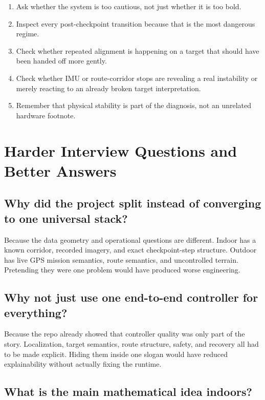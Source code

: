 \documentclass[11pt]{article}
\begin{document}
\begin{enumerate}[nosep]
  \item Ask whether the system is too cautious, not just whether it is too bold.
  \item Inspect every post-checkpoint transition because that is the most dangerous
  regime.
  \item Check whether repeated alignment is happening on a target that should have
  been handed off more gently.
  \item Check whether IMU or route-corridor stops are revealing a real instability
  or merely reacting to an already broken target interpretation.
  \item Remember that physical stability is part of the diagnosis, not an unrelated
  hardware footnote.
\end{enumerate}

\section{Harder Interview Questions and Better Answers}

\subsection*{Why did the project split instead of converging to one universal stack?}

Because the data geometry and operational questions are different. Indoor has a
known corridor, recorded imagery, and exact checkpoint-step structure. Outdoor has
live GPS mission semantics, route semantics, and uncontrolled terrain. Pretending
they were one problem would have produced worse engineering.

\subsection*{Why not just use one end-to-end controller for everything?}

Because the repo already showed that controller quality was only part of the story.
Localization, target semantics, route structure, safety, and recovery all had to be
made explicit. Hiding them inside one slogan would have reduced explainability
without actually fixing the runtime.

\subsection*{What is the main mathematical idea indoors?}
\end{document}
